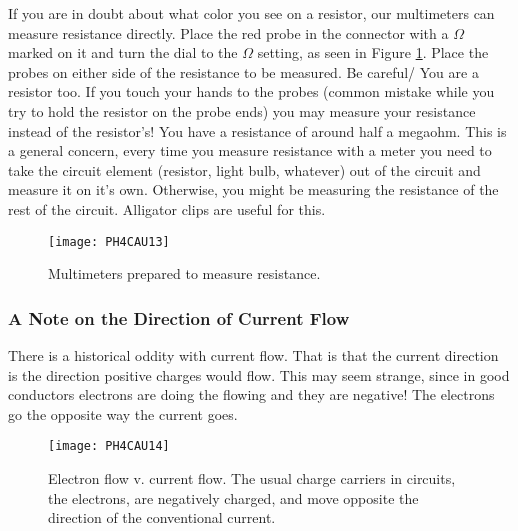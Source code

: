 If you are in doubt about what color you see on a resistor, our multimeters
can measure resistance directly. 
Place the red probe in the
connector with a $\Omega $ marked on it and turn the dial to the $\Omega $
setting, as seen in Figure \ref{fig:multimeter_ohms}.
Place the probes on either side of the resistance to be measured.
Be careful/ You are a resistor too. If you touch your hands to the probes
(common mistake while you try to hold the resistor on the probe ends) you
may measure your resistance instead of the resistor's! You have a resistance
of around half a megaohm. This is a general concern, every time you measure
resistance with a meter you need to take the circuit element (resistor,
light bulb, whatever) out of the circuit and measure it on it's own.
Otherwise, you might be measuring the resistance of the rest of the circuit.
Alligator clips are useful for this.
\begin{figure}[htbp!]
\centering
\texttt{[image: PH4CAU13]}
\caption[Multimeters prepared to measure resistance]{Multimeters prepared
to measure resistance.}
\label{fig:multimeter_ohms}
\end{figure}

\subsubsection{A Note on the Direction of Current Flow}

There is a historical oddity with current flow. That is that the current
direction is the direction positive charges would flow. This may seem
strange, since in good conductors electrons are doing the flowing and they
are negative! The electrons go the opposite way the current goes. 
\begin{figure}[htbp!]
\centering
\texttt{[image: PH4CAU14]}
\caption[Electron flow v. current]{Electron flow v. current flow. The 
usual charge carriers in circuits, the electrons, are negatively
charged, and move opposite the direction of the conventional current.}
\label{fig:electron_flow}
\end{figure}

